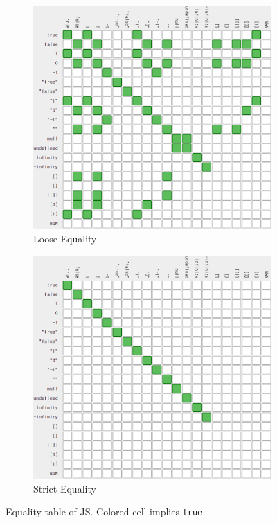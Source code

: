 \begin{figure}[htb]\vspace{10pt}\centering
    \begin{subfigure}{.48\textwidth}\centering
        \includegraphics[width=\textwidth]{images/basics-of-javascript/loose-equality.png}
        \caption{Loose Equality}
        \label{fig:loose-equality-table}
    \end{subfigure}
    \begin{subfigure}{.48\textwidth}\centering
        \includegraphics[width=\textwidth]{images/basics-of-javascript/strict-equality.png}
        \caption{Strict Equality}
        \label{fig:strict-equality-table}
    \end{subfigure}
    \caption{Equality table of JS. Colored cell implies \texttt{true}\protect\footnotemark}
    \label{fig:comparison-table}
\end{figure}

